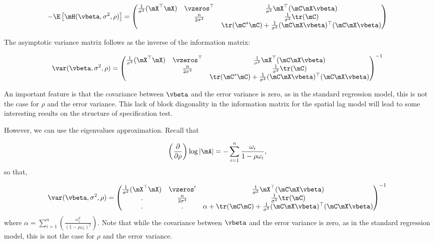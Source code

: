 \documentclass[english,12pt]{book}\usepackage[]{graphicx}\usepackage[]{xcolor}
\begin{document}
\begin{subappendices}
\begin{equation}\label{eq:expected-hessian-slm}
	- \E\left[\mH(\vbeta, \sigma^2, \rho) \right]= 
	\begin{pmatrix}
	\frac{1}{\sigma^2}(\mX^\top \mX) & \vzeros^\top & \frac{1}{\sigma^2} \mX^\top (\mC\mX\vbeta) \\
		 &  \frac{n}{2\sigma^4} & \frac{1}{\sigma^2} \tr(\mC)\\
		 &  & \tr(\mC^s\mC) + \frac{1}{\sigma^2}(\mC\mX\vbeta)^\top(\mC\mX\vbeta)
	\end{pmatrix} 
\end{equation}

The asymptotic variance matrix follows as the inverse of the information matrix:

\begin{equation}\label{eq:asyvar_slm}
	\var(\vbeta, \sigma^2, \rho)= 
	\begin{pmatrix}
	\frac{1}{\sigma^2}(\mX^\top \mX) & \vzeros^\top & \frac{1}{\sigma^2} \mX^\top (\mC\mX\vbeta) \\
		 &  \frac{n}{2\sigma^4} & \frac{1}{\sigma^2} \tr(\mC)\\
		 &  & \tr(\mC^s\mC) + \frac{1}{\sigma^2}(\mC\mX\vbeta)^\top(\mC\mX\vbeta)
	\end{pmatrix} ^{-1}
\end{equation}

An important feature is that the covariance between $\vbeta$ and the error variance is zero, as in the standard regression model, this is not the case for $\rho$ and the error variance. This lack of block diagonality in the information matrix for the spatial lag model will lead to some interesting results on the structure of specification test.

However, we can use the eigenvalues approximation. Recall that 

\begin{equation}
\left(\frac{\partial }{\partial \rho}\right)\log \left|\mA \right| = -\sum_{i=1}^n\frac{\omega_i}{1-\rho\omega_i}, 
\end{equation}
%
so that, 

\begin{equation*}
	\var(\vbeta, \sigma^2, \rho)= 
	\begin{pmatrix}
	\frac{1}{\sigma^2}(\mX^\top \mX) & \vzeros' & \frac{1}{\sigma^2} \mX^\top (\mC\mX\vbeta) \\
		. &  \frac{n}{2\sigma^4} & \frac{1}{\sigma^2} \tr(\mC)\\
		. &  .& \alpha + \tr(\mC\mC) + \frac{1}{\sigma^2}(\mC\mX\vbeta)^\top(\mC\mX\vbeta)
	\end{pmatrix} ^{-1}
\end{equation*}
%
where $\alpha = \sum_{i=1}^n\left(\frac{\omega_i^2}{(1-\rho\omega_i)^2}\right)$. Note that while the covariance between $\vbeta$ and the error variance is zero, as in the standard regression model, this is not the case for $\rho$ and the error variance. 
\end{subappendices}
\end{document}
